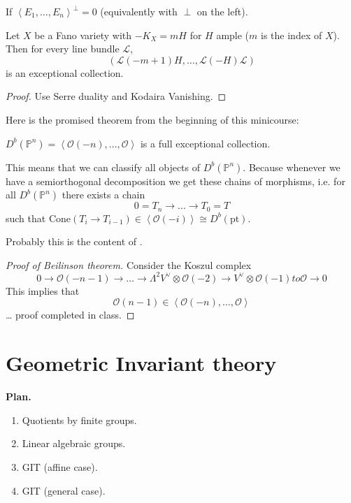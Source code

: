 \begin{definition}
\label{definition-full-exceptional-collection}
If $\left<E_1,\ldots,E_n\right>^\perp=0$ (equivalently with $\perp$ on the
left).
\end{definition}

\begin{exercise}
\label{exercise-exceptional-collections-for-Fano}
Let $X$ be a Fano variety with $-K_X=mH$ for $H$ ample ($m$ is the index of
$X$). Then for every line bundle $\mathcal{L}$,
$$
(\mathcal{L}(-m+1)H,\ldots,\mathcal{L}(-H)\mathcal{L})
$$
is an exceptional collection.
\end{exercise}

\begin{proof}
Use Serre duality and Kodaira Vanishing.
\end{proof}

\medskip\noindent
Here is the promised theorem from the beginning of this minicourse:

\begin{theorem}[Beilinson]
\label{theorem-Beilinson}
$D^b(\mathbb{P}^n)=\left<\mathcal{O}(-n),\ldots,\mathcal{O}\right>$ is a full
exceptional collection.
\end{theorem}

This means that we can classify all objects of $D^b(\mathbb{P}^n)$. Because 
whenever we have a semiorthogonal decomposition we get 
these chains of morphisms, i.e. for all $D^b(\mathbb{P}^n)$ there exists a chain 
$$
0=T_n \to \ldots \to T_0=T
$$
such that $\text{Cone}(T_i \to T_{i-1}) \in \left<\mathcal{O}(-i)\right> \cong
D^b(\text{pt})$.

Probably this is the content of \cite{Beilinson-derived}.

\begin{proof}[Proof of Beilinson theorem]
Consider the Koszul complex
$$
0\to \mathcal{O}(-n-1)\to\ldots \to \Lambda^{2}V^\vee \otimes \mathcal{O}(-2)
\to V^{\vee}\otimes \mathcal{O}(-1) to \mathcal{O} \to0
$$
This implies that
$$
\mathcal{O}(n-1) \in \left< \mathcal{O}(-n),\ldots,\mathcal{O}\right>
$$
… proof completed in class.
\end{proof}

\section{Geometric Invariant theory}
\label{section-GIT}

{\bf Plan.} 
\begin{enumerate}
\item Quotients by finite groups.
\item Linear algebraic groups.
\item GIT (affine case).
\item GIT (general case).
\end{enumerate}

